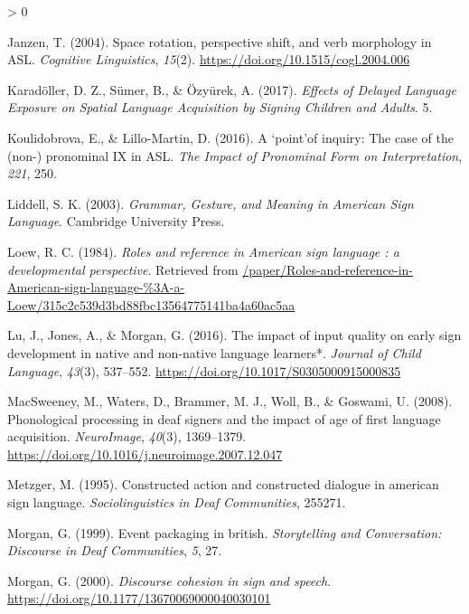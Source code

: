 \documentclass[
  english,
  doc,mask]{apa6}
\newlength{\cslhangindent}
\newenvironment{CSLReferences}[2] %
 {%
  \setlength{\parindent}{0pt}
  \ifodd #1 \everypar{\setlength{\hangindent}{\cslhangindent}}\ignorespaces\fi
  \ifnum #2 > 0
  \setlength{\parskip}{#2\baselineskip}
  \fi
 }%
 {}
\begin{document}
\begin{CSLReferences}{1}{0}
\leavevmode\hypertarget{ref-janzen2004}{}%
Janzen, T. (2004). Space rotation, perspective shift, and verb morphology in ASL. \emph{Cognitive Linguistics}, \emph{15}(2). \url{https://doi.org/10.1515/cogl.2004.006}

\leavevmode\hypertarget{ref-karaduxf6ller2017}{}%
Karadöller, D. Z., Sümer, B., \& Özyürek, A. (2017). \emph{Effects of Delayed Language Exposure on Spatial Language Acquisition by Signing Children and Adults}. 5.

\leavevmode\hypertarget{ref-koulidobrova2016}{}%
Koulidobrova, E., \& Lillo-Martin, D. (2016). A {`}point{'}of inquiry: The case of the (non-) pronominal IX in ASL. \emph{The Impact of Pronominal Form on Interpretation}, \emph{221}, 250.

\leavevmode\hypertarget{ref-liddell2003}{}%
Liddell, S. K. (2003). \emph{Grammar, Gesture, and Meaning in American Sign Language}. Cambridge University Press.

\leavevmode\hypertarget{ref-loew1984}{}%
Loew, R. C. (1984). \emph{Roles and reference in American sign language : a developmental perspective}. Retrieved from \href{https:///paper/Roles-and-reference-in-American-sign-language-\%3A-a-Loew/315c2c539d3bd88fbc13564775141ba4a60ac5aa}{/paper/Roles-and-reference-in-American-sign-language-\%3A-a-Loew/315c2c539d3bd88fbc13564775141ba4a60ac5aa}

\leavevmode\hypertarget{ref-lu2016}{}%
Lu, J., Jones, A., \& Morgan, G. (2016). The impact of input quality on early sign development in native and non-native language learners*. \emph{Journal of Child Language}, \emph{43}(3), 537--552. \url{https://doi.org/10.1017/S0305000915000835}

\leavevmode\hypertarget{ref-macsweeney2008}{}%
MacSweeney, M., Waters, D., Brammer, M. J., Woll, B., \& Goswami, U. (2008). Phonological processing in deaf signers and the impact of age of first language acquisition. \emph{NeuroImage}, \emph{40}(3), 1369--1379. \url{https://doi.org/10.1016/j.neuroimage.2007.12.047}

\leavevmode\hypertarget{ref-metzger1995}{}%
Metzger, M. (1995). Constructed action and constructed dialogue in american sign language. \emph{Sociolinguistics in Deaf Communities}, 255271.

\leavevmode\hypertarget{ref-morgan1999}{}%
Morgan, G. (1999). Event packaging in british. \emph{Storytelling and Conversation: Discourse in Deaf Communities}, \emph{5}, 27.

\leavevmode\hypertarget{ref-morgan2000}{}%
Morgan, G. (2000). \emph{Discourse cohesion in sign and speech}. \url{https://doi.org/10.1177/13670069000040030101}


\end{CSLReferences}
\end{document}
